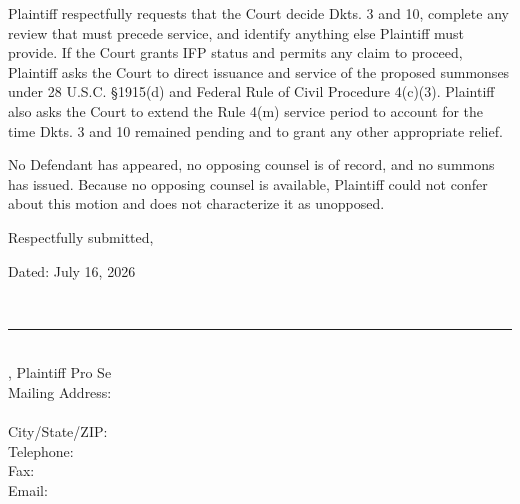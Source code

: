 \documentclass[12pt]{article}
\renewcommand{\FilingDate}{July 16, 2026}
\begin{document}
Plaintiff respectfully requests that the Court decide Dkts. 3 and 10, complete any review that must precede service, and identify anything else Plaintiff must provide. If the Court grants IFP status and permits any claim to proceed, Plaintiff asks the Court to direct issuance and service of the proposed summonses under 28 U.S.C. \S 1915(d) and Federal Rule of Civil Procedure 4(c)(3). Plaintiff also asks the Court to extend the Rule 4(m) service period to account for the time Dkts. 3 and 10 remained pending and to grant any other appropriate relief.

No Defendant has appeared, no opposing counsel is of record, and no summons has issued. Because no opposing counsel is available, Plaintiff could not confer about this motion and does not characterize it as unopposed.

\singlespacing
\vspace{0.25em}
\noindent Respectfully submitted,

\vspace{0.5em}
\noindent Dated: \FilingDate

\vspace{0.5em}
\noindent\makebox[3.2in][l]{\SignatureFourOnLine[width=1.5in]}\\[-0.35em]
\rule{3.2in}{0.4pt}\\
\FilingPlaintiffName, Plaintiff Pro Se\\
Mailing Address: \FilingPlaintiffMailingLineOne\\
\phantom{Mailing Address: }\FilingPlaintiffMailingLineTwo\\
City/State/ZIP: \FilingPlaintiffMailingCityStateZip\\
Telephone: \FilingPlaintiffTelephone\\
Fax: \FilingPlaintiffFax\\
Email: \FilingPlaintiffEmail
\end{document}
